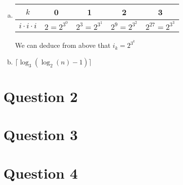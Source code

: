 \documentclass[12pt]{article}
\begin{document}
\begin{enumerate}[a.]
    \item

    \begin{tabular}{|c|c|c|c|c|}
        \hline
        $k$ & 0 & 1 & 2 & 3\\
        \hline
        $i \cdot i \cdot i$ & $2 = 2^{3^0}$ & $2^3 = 2^{3^1}$ & $2^9 = 2^{3^2}$ & $2^27 = 2^{3^3}$\\
        \hline
    \end{tabular}

    We can deduce from above that $i_k = 2^{3^k}$

    \item

    $\lceil \log_3 (\log_2 (n) - 1) \rceil$

\end{enumerate}

\section*{Question 2}

\section*{Question 3}

\section*{Question 4}
\end{document}
